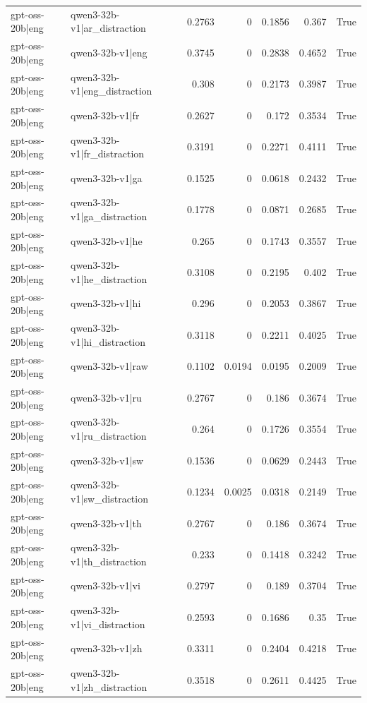 \begin{table}
\begin{tabular}{l l r r r r l}
gpt-oss-20b|eng & qwen3-32b-v1|ar_distraction & 0.2763 & 0 & 0.1856 & 0.367 & True \\
gpt-oss-20b|eng & qwen3-32b-v1|eng & 0.3745 & 0 & 0.2838 & 0.4652 & True \\
gpt-oss-20b|eng & qwen3-32b-v1|eng_distraction & 0.308 & 0 & 0.2173 & 0.3987 & True \\
gpt-oss-20b|eng & qwen3-32b-v1|fr & 0.2627 & 0 & 0.172 & 0.3534 & True \\
gpt-oss-20b|eng & qwen3-32b-v1|fr_distraction & 0.3191 & 0 & 0.2271 & 0.4111 & True \\
gpt-oss-20b|eng & qwen3-32b-v1|ga & 0.1525 & 0 & 0.0618 & 0.2432 & True \\
gpt-oss-20b|eng & qwen3-32b-v1|ga_distraction & 0.1778 & 0 & 0.0871 & 0.2685 & True \\
gpt-oss-20b|eng & qwen3-32b-v1|he & 0.265 & 0 & 0.1743 & 0.3557 & True \\
gpt-oss-20b|eng & qwen3-32b-v1|he_distraction & 0.3108 & 0 & 0.2195 & 0.402 & True \\
gpt-oss-20b|eng & qwen3-32b-v1|hi & 0.296 & 0 & 0.2053 & 0.3867 & True \\
gpt-oss-20b|eng & qwen3-32b-v1|hi_distraction & 0.3118 & 0 & 0.2211 & 0.4025 & True \\
gpt-oss-20b|eng & qwen3-32b-v1|raw & 0.1102 & 0.0194 & 0.0195 & 0.2009 & True \\
gpt-oss-20b|eng & qwen3-32b-v1|ru & 0.2767 & 0 & 0.186 & 0.3674 & True \\
gpt-oss-20b|eng & qwen3-32b-v1|ru_distraction & 0.264 & 0 & 0.1726 & 0.3554 & True \\
gpt-oss-20b|eng & qwen3-32b-v1|sw & 0.1536 & 0 & 0.0629 & 0.2443 & True \\
gpt-oss-20b|eng & qwen3-32b-v1|sw_distraction & 0.1234 & 0.0025 & 0.0318 & 0.2149 & True \\
gpt-oss-20b|eng & qwen3-32b-v1|th & 0.2767 & 0 & 0.186 & 0.3674 & True \\
gpt-oss-20b|eng & qwen3-32b-v1|th_distraction & 0.233 & 0 & 0.1418 & 0.3242 & True \\
gpt-oss-20b|eng & qwen3-32b-v1|vi & 0.2797 & 0 & 0.189 & 0.3704 & True \\
gpt-oss-20b|eng & qwen3-32b-v1|vi_distraction & 0.2593 & 0 & 0.1686 & 0.35 & True \\
gpt-oss-20b|eng & qwen3-32b-v1|zh & 0.3311 & 0 & 0.2404 & 0.4218 & True \\
gpt-oss-20b|eng & qwen3-32b-v1|zh_distraction & 0.3518 & 0 & 0.2611 & 0.4425 & True \\

\end{tabular}
\end{table}
